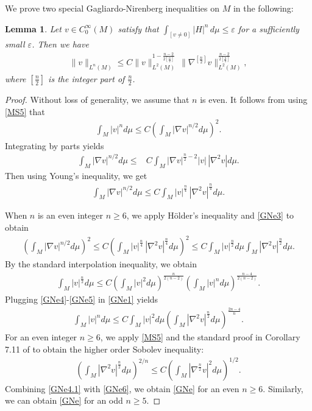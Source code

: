 \documentclass{amsart}
\newtheorem{lemma}[theorem]{Lemma}
\theoremstyle{definition}
\numberwithin{equation}{section}
\begin{document}
We  prove two special Gagliardo-Nirenberg  inequalities on $M$ in the following:
\begin{lemma}\label{LGN}Let $v\in
C_0^{\infty}(M)$ satisfy  that $\int_{[v\neq 0]}|H|^n\,d\mu\leq \varepsilon$ for a sufficiently small $\varepsilon$.
Then we have
\begin{align}\label{GNe}
\|v\|_{L^n(M)}\leq C\| v\|^{1-\frac {n-2}{2[\frac n2]} }_{L^2(M)}\, \|\nabla^{[\frac n 2]} v\|^{\frac {n-2}{2[\frac n2]}}_{L^2(M)},
\end{align}
where $[\frac n 2]$ is the integer part of $\frac n 2$.
\end{lemma}
\begin{proof}Without loss of generality, we assume that $n$ is even.
It follows from using \eqref{MS5} that
\begin{align}\label{GNe1}
\int_M  |v|^{n} d\mu  \leq C\left ( \int_M |\nabla v|^{n/2}d\mu  \right )^2 .
\end{align}
Integrating by parts  yields
\begin{align*}
\int_M |\nabla v|^{n/2}d\mu  \leq &C\int_M |\nabla v|^{\frac n 2 -2}|v|\,|\nabla^2  v|  d\mu.
\end{align*}
Then using   Young's inequality, we get
\begin{align}\label{GNe3}
\int_M |\nabla v|^{n/2}d\mu  \leq C\int_M  |v|^{\frac n 4}\,|\nabla^2  v|^{\frac n 4}  d\mu .
\end{align}

When   $n$ is an even integer $n\geq 6$, we  apply  H\"older's inequality and \eqref{GNe3} to obtain
\begin{align}\label{GNe4}
\left (\int_M |\nabla v|^{n/2}d\mu \right )^2 \leq C\left (\int_M  |v|^{\frac n 4}\,|\nabla^2  v|^{\frac n 4}  d\mu \right )^2\leq C \int_M
|v|^{\frac n 2} d\mu \int_M  |\nabla^2  v|^{\frac n 2}  d\mu  .
\end{align}
By the standard interpolation inequality, we obtain
\begin{align}\label{GNe5}
 \int_M  |v|^{\frac n 2} d\mu \leq C\left (\int_M  |v|^{2} d\mu\right )^{\frac n{2(n-2)} }\left (\int_M  |v|^{n} d\mu\right )^{\frac
 {n-4}{2(n-2)}}.
\end{align}
Plugging \eqref{GNe4}-\eqref{GNe5} in  \eqref{GNe1} yields
\begin{align}\label{GNe6}
\int_M  |v|^{n} d\mu   \leq C   \int_M  |v|^{2} d\mu \left ( \int_M |\nabla^{2} v|^{\frac n2} d\mu  \right )^{\frac {2n-4} n}.
\end{align}
For an even integer $n\geq 6$,   we apply  \eqref{MS5} and the standard proof in Corollary 7.11 of \cite{GT} to obtain the higher
order Sobolev inequality:
\begin{align}\label{GNe4.1}
\left (\int_M  |\nabla^2  v|^{\frac n 2}  d\mu\right )^{2/n}\leq C\left (\int_M  |\nabla^{\frac n 2}  v|^2  d\mu\right )^{1/2}.
\end{align}
Combining \eqref{GNe4.1} with \eqref{GNe6}, we obtain \eqref{GNe} for an even $n\geq 6$.
Similarly, we can obtain \eqref{GNe} for an odd $n\geq 5$.
 \end{proof}
\end{document}

